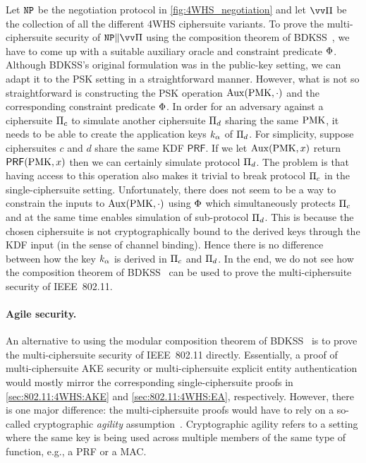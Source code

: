 Let $\mathtt{NP}$ be the negotiation protocol in \cref{fig:4WHS_negotiation} 
and let $\vprotocol$ be the collection of all the different 4WHS ciphersuite variants.
To prove the multi-ciphersuite security of $\multiprotocol$ using the composition theorem of BDKSS~\cite{CCS:BDKSS14},
we have to come up with a suitable auxiliary oracle and constraint predicate $\Phi$.
Although BDKSS's original formulation was in the public-key setting,
we can adapt it to the PSK setting in a straightforward manner.
However,
what is not so straightforward is constructing the PSK operation $\mathrm{Aux}(\mathrm{PMK}, \cdot)$ and the corresponding constraint predicate $\Phi$.
In order for an adversary against a ciphersuite $\mathrm{\Pi}_c$ to simulate another ciphersuite $\mathrm{\Pi}_d$ sharing the same $\mathrm{PMK}$,
it needs to be able to create the application keys $k_\alpha$ of $\mathrm{\Pi}_d$.
For simplicity,
suppose ciphersuites $c$ and $d$ share the same KDF $\mathsf{PRF}$.
If we let $\mathrm{Aux}(\mathrm{PMK}, x)$ return $\mathsf{PRF}(\mathrm{PMK}, x)$ then we can certainly simulate protocol $\mathrm{\Pi}_d$.
The problem is that having access to this operation also makes it trivial to break protocol $\mathrm{\Pi}_c$
in the single-ciphersuite setting.
Unfortunately,
there does not seem to be a way to constrain the inputs to $\mathrm{Aux}(\mathrm{PMK}, \cdot)$ using $\Phi$
which simultaneously  protects $\mathrm{\Pi}_c$ and at the same time enables simulation of sub-protocol $\mathrm{\Pi}_d$.
This is because the chosen ciphersuite is not cryptographically bound to the derived keys through the KDF input
(in the sense of channel binding).
Hence there is no difference between how the key $k_{\alpha}$ is derived in $\mathrm{\Pi}_c$ and $\mathrm{\Pi}_d$.
In the end,
we do not see how the composition theorem of BDKSS~\cite{CCS:BDKSS14} can be used to prove the multi-ciphersuite security of IEEE~802.11.

\paragraph{Agile security.}
An alternative to using the modular composition theorem of BDKSS~\cite{CCS:BDKSS14}
is to prove the multi-ciphersuite security of IEEE~802.11 directly.
Essentially,
a proof of multi-ciphersuite AKE security  or multi-ciphersuite explicit entity authentication would mostly mirror the corresponding single-ciphersuite proofs in \cref{sec:802.11:4WHS:AKE} and \cref{sec:802.11:4WHS:EA}, respectively.
However,
there is one major difference:
the multi-ciphersuite proofs would have to rely on a so-called cryptographic \emph{agility} assumption~\cite{EC:ABBC10,C:BFKPSZ14}.
Cryptographic agility refers to a setting where the same key is being used across multiple members of the same type of function,
e.g., a PRF or a MAC.

